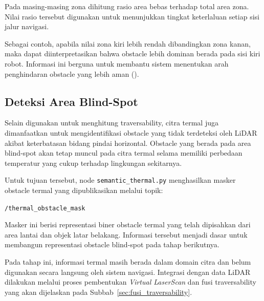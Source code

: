 Pada masing-masing zona dihitung rasio area bebas terhadap total area zona. Nilai rasio tersebut digunakan untuk menunjukkan tingkat keterlaluan setiap sisi jalur navigasi.

Sebagai contoh, apabila nilai zona kiri lebih rendah dibandingkan zona kanan, maka dapat diinterpretasikan bahwa obstacle lebih dominan berada pada sisi kiri robot. Informasi ini berguna untuk membantu sistem menentukan arah penghindaran obstacle yang lebih aman (\cite{Sevastopoulos2022}).

\subsection{Deteksi Area Blind-Spot}

Selain digunakan untuk menghitung traversability, citra termal juga dimanfaatkan untuk mengidentifikasi obstacle yang tidak terdeteksi oleh LiDAR akibat keterbatasan bidang pindai horizontal. Obstacle yang berada pada area blind-spot akan tetap muncul pada citra termal selama memiliki perbedaan temperatur yang cukup terhadap lingkungan sekitarnya.

Untuk tujuan tersebut, node \texttt{semantic\_thermal.py} menghasilkan masker obstacle termal yang dipublikasikan melalui topik:

\begin{center}
\texttt{/thermal\_obstacle\_mask}
\end{center}

Masker ini berisi representasi biner obstacle termal yang telah dipisahkan dari area lantai dan objek latar belakang. Informasi tersebut menjadi dasar untuk membangun representasi obstacle blind-spot pada tahap berikutnya.

Pada tahap ini, informasi termal masih berada dalam domain citra dan belum digunakan secara langsung oleh sistem navigasi. Integrasi dengan data LiDAR dilakukan melalui proses pembentukan \textit{Virtual LaserScan} dan fusi traversability yang akan dijelaskan pada Subbab~\ref{sec:fusi_traversability}.